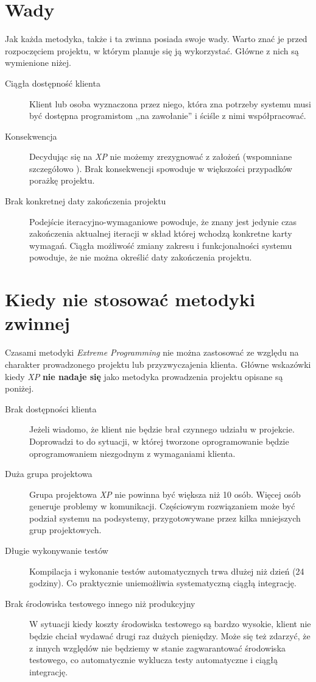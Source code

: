 \section{Wady}
\label{sec:ZMTOwady}

Jak każda metodyka, także i ta zwinna posiada swoje wady. Warto znać je przed rozpoczęciem projektu, w którym planuje się ją wykorzystać. Główne z nich są wymienione niżej.

\begin{description}
    \item[Ciągła dostępność klienta]{Klient lub osoba wyznaczona przez niego, która zna potrzeby systemu musi być dostępna programistom ,,na zawołanie'' i ściśle z nimi współpracować.}
    \item[Konsekwencja]{Decydując się na \textit{XP} nie możemy zrezygnować z założeń (wspomniane szczegółowo ). Brak konsekwencji spowoduje w większości przypadków porażkę projektu.}
    \item[Brak konkretnej daty zakończenia projektu]{Podejście iteracyjno-wymaganiowe powoduje, że znany jest jedynie czas zakończenia aktualnej iteracji w skład której wchodzą konkretne karty wymagań. Ciągła możliwość zmiany zakresu i funkcjonalności systemu powoduje, że nie można określić daty zakończenia projektu.}
\end{description}

\section{Kiedy nie stosować metodyki zwinnej}
\label{sec:ZMTOknsm}

Czasami metodyki \textit{Extreme Programming} nie można zastosować ze względu na charakter prowadzonego projektu lub przyzwyczajenia klienta. Główne wskazówki kiedy \textit{XP} \textbf{nie nadaje się} jako metodyka prowadzenia projektu opisane są poniżej.

\begin{description}
    \item[Brak dostępności klienta]Jeżeli wiadomo, że klient nie będzie brał czynnego udziału w projekcie. Doprowadzi to do sytuacji, w której tworzone oprogramowanie będzie oprogramowaniem niezgodnym z wymaganiami klienta.
    \item[Duża grupa projektowa] Grupa projektowa \textit{XP} nie powinna być większa niż 10 osób. Więcej osób generuje problemy w komunikacji. Częściowym rozwiązaniem może być podział systemu na podsystemy, przygotowywane przez kilka mniejszych grup projektowych.
    \item[Długie wykonywanie testów] Kompilacja i wykonanie testów automatycznych trwa dłużej niż dzień (24 godziny). Co praktycznie uniemożliwia systematyczną ciągłą integrację.
    \item[Brak środowiska testowego innego niż produkcyjny] W sytuacji kiedy koszty środowiska testowego są bardzo wysokie, klient nie będzie chciał wydawać drugi raz dużych pieniędzy. Może się też zdarzyć, że z innych względów nie będziemy w stanie zagwarantować środowiska testowego, co automatycznie wyklucza testy automatyczne i ciągłą integrację.
\end{description}

